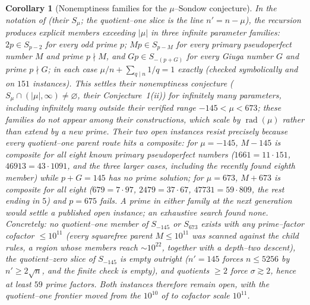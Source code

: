 \documentclass[11pt]{article}
\newtheorem{corollary}[theorem]{Corollary}
\theoremstyle{definition}
\begin{document}
\begin{corollary}[Nonemptiness families for the $\mu$--Sondow conjecture]\label{cor:gos}
In the notation of \cite{GrauOllerMarcenSadornil2021} (their $S_\mu$; the quotient--one slice is the line
$n'=n-\mu$), the recursion produces explicit members exceeding $|\mu|$ in three infinite parameter families:
$2p\in S_{p-2}$ for every odd prime $p$; $Mp\in S_{p-M}$ for every primary pseudoperfect number $M$ and
prime $p\nmid M$, and $Gp\in S_{-(p+G)}$ for every Giuga number $G$ and prime $p\nmid G$; in each case
$\mu/n+\sum_{q\mid n}1/q=1$ exactly (checked symbolically and on $151$ instances). This settles their
nonemptiness conjecture ($S_\mu\cap(|\mu|,\infty)\ne\varnothing$, their Conjecture~1(ii)) for infinitely
many parameters, including infinitely many outside their verified range $-145<\mu<673$; these families do
not appear among their constructions, which scale by $\operatorname{rad}(\mu)$ rather than extend by a new
prime. Their two open instances resist precisely because every quotient--one parent route hits a composite:
for $\mu=-145$, $M-145$ is composite for all eight known primary pseudoperfect numbers
($1661=11\cdot151$, $46913=43\cdot1091$, and the three larger cases, including the recently found eighth
member) while $p+G=145$ has no prime solution; for $\mu=673$, $M+673$ is composite for all eight
($679=7\cdot97$, $2479=37\cdot67$, $47731=59\cdot809$, the rest ending in $5$) and $p=675$ fails. A prime
in either family at the next generation would settle a published open instance; an exhaustive search found
none. Concretely: no quotient--one member of $S_{-145}$ or $S_{673}$ exists with \emph{any} prime--factor
cofactor $\le10^{11}$ (every squarefree parent $M\le10^{11}$ was scanned against the child rules, a region
whose members reach ${\sim}10^{22}$, together with a depth--two descent), the quotient--zero slice of
$S_{-145}$ is empty outright ($n'=145$ forces $n\le5256$ by $n'\ge2\sqrt n$, and the finite check is
empty), and quotients $\ge2$ force $\sigma\gtrsim2$, hence at least $59$ prime factors. Both instances
therefore remain open, with the quotient--one frontier moved from the $10^{10}$ of
\cite{GrauOllerMarcenSadornil2021} to cofactor scale $10^{11}$.
\end{corollary}
\end{document}
